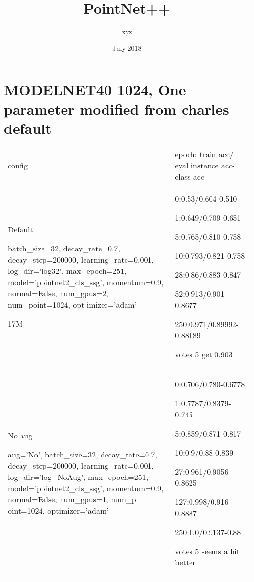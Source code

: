 \documentclass[,table,dvipsnames]{article}
\title{PointNet++}
\author{xyz}
\date{July 2018}
\begin{document}
\noindent
\begin{titlepage}
	\maketitle
\end{titlepage}	


\section{MODELNET40 1024, One parameter modified from charles default}
\noindent\begin{tabular}{|p{10cm}|p{5.5cm}| }	
	\hline
	
	config & epoch: train acc/ eval instance acc-class acc\\
	
	\rowcolor{green!20}
	Default\par 
	batch\_size=32, decay\_rate=0.7, decay\_step=200000, learning\_rate=0.001, log\_dir='log32', max\_epoch=251, model='pointnet2\_cls\_ssg', momentum=0.9, normal=False, num\_gpus=2, num\_point=1024, opt     imizer='adam' \par 17M&
	0:0.53/0.604-0.510\par 1:0.649/0.709-0.651\par 5:0.765/0.810-0.758\par 10:0.793/0.821-0.758\par 28:0.86/0.883-0.847\par 52:0.913/0.901-0.8677\par 250:0.971/0.89992-0.88189\par votes 5 get 0.903\\
	
	\rowcolor{yellow!20}
	No aug\par
	aug='No', batch\_size=32, decay\_rate=0.7, decay\_step=200000, learning\_rate=0.001, log\_dir='log\_NoAug', max\_epoch=251, model='pointnet2\_cls\_ssg', momentum=0.9, normal=False, num\_gpus=1, num\_p     oint=1024, optimizer='adam' & 0:0.706/0.780-0.6778\par 1:0.7787/0.8379-0.745\par 5:0.859/0.871-0.817\par 10:0.9/0.88-0.839 \par 27:0.961/0.9056-0.8625\par 127:0.998/0.916-0.8887\par 250:1.0/0.9137-0.88\par votes 5 seems a bit better\\	


\end{tabular}
\end{document}
